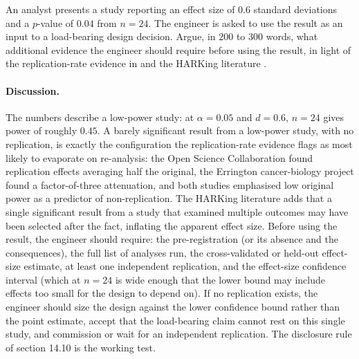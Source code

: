 \begin{exercise}
An analyst presents a study reporting an effect size of $0.6$
standard deviations and a $p$-value of $0.04$ from $n = 24$. The
engineer is asked to use the result as an input to a load-bearing
design decision. Argue, in 200 to 300 words, what additional
evidence the engineer should require before using the result, in
light of the replication-rate evidence in
\cite{method:open-science-collaboration-2015,method:errington-cancer-biology-2021}
and the HARKing literature \cite{method:kerr-harking-1998}.

\paragraph{Discussion.} The numbers describe a low-power
study: at $\alpha = 0.05$ and $d = 0.6$, $n = 24$ gives power
of roughly $0.45$. A barely significant result from a low-power
study, with no replication, is exactly the configuration the
replication-rate evidence flags as most likely to evaporate on
re-analysis: the Open Science Collaboration found replication
effects averaging half the original, the Errington cancer-biology
project found a factor-of-three attenuation, and both studies
emphasised low original power as a predictor of non-replication.
The HARKing literature adds that a single significant result from
a study that examined multiple outcomes may have been selected
after the fact, inflating the apparent effect size. Before
using the result, the engineer should require: the
pre-registration (or its absence and the consequences),
the full list of analyses run, the cross-validated or held-out
effect-size estimate, at least one independent replication, and
the effect-size confidence interval (which at $n = 24$ is wide
enough that the lower bound may include effects too small for
the design to depend on). If no replication exists, the
engineer should size the design against the lower confidence
bound rather than the point estimate, accept that the
load-bearing claim cannot rest on this single study, and
commission or wait for an independent replication. The
disclosure rule of section 14.10 is the working test.
\end{exercise}
